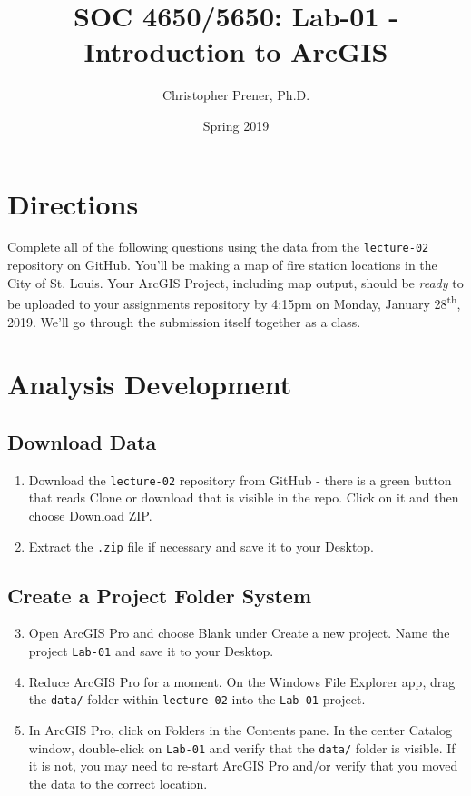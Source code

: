 \documentclass{tufte-handout}
\title{SOC 4650/5650: Lab-01 - Introduction to ArcGIS }
\author{Christopher Prener, Ph.D.}
\date{Spring 2019}
\begin{document}
\maketitle %

\vspace{5mm}
\section{Directions}
Complete all of the following questions using the data from the \texttt{lecture-02} repository on GitHub. You'll be making a map of fire station locations in the City of St. Louis. Your ArcGIS Project, including map output, should be \textit{ready} to be uploaded to your assignments repository by 4:15pm on Monday, January 28\textsuperscript{th}, 2019. We'll go through the submission itself together as a class.

\vspace{5mm}
\section{Analysis Development}
\subsection{Download Data}
\begin{enumerate}[label=\alph*.]
\item Download the \texttt{lecture-02} repository from GitHub - there is a \textsf{green button} that reads \textsf{Clone or download} that is visible in the repo. \textsf{Click} on it and then choose \textsf{Download ZIP}.
\item Extract the \texttt{.zip} file if necessary and save it to your Desktop.
\end{enumerate}

\vspace{3mm}
\subsection{Create a Project Folder System}
\begin{enumerate}[label=\alph*.]
\setcounter{enumi}{2}
\item Open ArcGIS Pro and choose \textsf{Blank} under \textsf{Create a new project}. Name the project \texttt{Lab-01} and save it to your Desktop.
\item Reduce ArcGIS Pro for a moment. On the Windows File Explorer app, drag the \texttt{data/} folder within \texttt{lecture-02} into the \texttt{Lab-01} project.
\item In ArcGIS Pro, click on \textsf{Folders} in the \textsf{Contents} pane. In the center \textsf{Catalog} window, \textsf{double-click} on \texttt{Lab-01} and verify that the \texttt{data/} folder is visible. If it is not, you may need to re-start ArcGIS Pro and/or verify that you moved the data to the correct location.
\end{enumerate}
\end{document}
